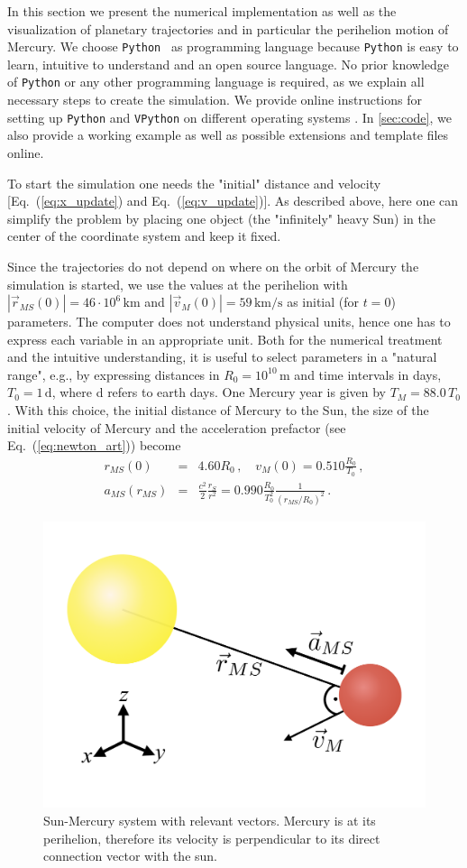 \documentclass[12pt,ngerman,american]{iopart}
\newcommand{\python}[0]{\texttt{Python}}
\newcommand{\vpython}[0]{\texttt{VPython}}
\newcommand{\abs}[1]{\left\vert #1 \right\vert}
\begin{document}
In this section we present the numerical implementation as well as the visualization of planetary trajectories and in
particular the perihelion motion of Mercury.
We choose \python{}~\cite{Python} as programming language because \python{} is easy to learn, intuitive to understand and an open source language.
No prior knowledge of \python{} or any other programming language is required, as we explain all necessary steps to create the simulation.
We provide online instructions for setting up \python{} and \vpython{} on different operating systems \cite{scripts}.
In \ref{sec:code}, we also provide a working example as well as possible extensions and template files online.

To start the simulation one needs the "initial" distance and velocity [Eq.~(\ref{eq:x_update}) and Eq.~(\ref{eq:v_update})].
As described above, here one can simplify the problem by placing one object (the "infinitely" heavy Sun) in the center of the coordinate system and keep it fixed.

Since the trajectories do not depend on where on the orbit of Mercury the simulation is started, we
use the values at the perihelion with $\abs{\vec r_{MS}(0)} = 46 \cdot 10^6\,\mathrm{km}$ and $\abs{\vec v_M(0)} = 59\,\mathrm{km/s}$\cite{MercuryFactSheet} as initial (for $t=0$) parameters.
The computer does not understand physical units, hence one has to express each variable in an appropriate unit.
Both for the numerical treatment and the intuitive understanding, it is useful to select parameters in a "natural range", e.g.,
by expressing distances in $R_0 = 10^{10}\,\mathrm{m}$ and time intervals in days, $T_0 = 1\,\mathrm{d}$, where d refers to earth days. One Mercury year is given by $T_M=88.0\,T_0$.
With this choice, the initial distance of Mercury to the Sun, the size of the initial velocity of Mercury and the acceleration prefactor (see Eq.~(\ref{eq:newton_art})) become
\begin{eqnarray}
r_{MS}(0)   &=& 4.60 R_0 \, , \quad
v_{M}(0)    = 0.510 \frac{R_0}{T_0} \, ,  \\
a_{MS}(r_{MS}) &=& \frac{c^2}{2}\frac{r_S}{r^2} = 0.990 \frac{R_0}{T_0^2} \frac{1}{{\left(r_{MS}/R_0\right)}^2}\, .
\end{eqnarray}

%
\begin{figure}[htb]
	\centering
	\includegraphics[width=.5\textwidth]{figs/sun_merc.pdf}
	\caption{\label{fig:sun_merc}%
		Sun-Mercury system with relevant vectors.
		Mercury is at its perihelion, therefore its velocity is perpendicular to its direct connection vector with the sun.%
	}
\end{figure}
%
\end{document}
